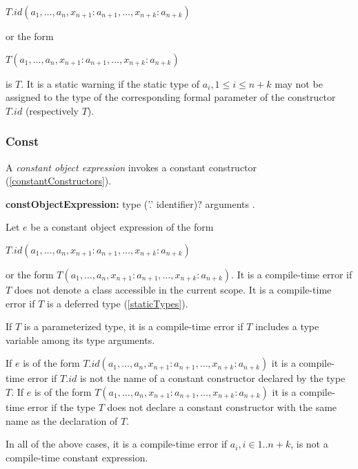 \documentclass{article}
\begin{document}
\NEW{} $T.id(a_1, \ldots , a_n, x_{n+1}: a_{n+1}, \ldots , x_{n+k}: a_{n+k})$ 

or the form 

\NEW{} $T(a_1, \ldots , a_n, x_{n+1}: a_{n+1}, \ldots , x_{n+k}: a_{n+k})$ 

is $T$.  
It is a static warning if the static type of $a_i, 1 \le i \le n+ k$ may not be assigned to the type of the corresponding formal parameter of the constructor $T.id$ (respectively $T$).



\subsubsection{ Const}

\LMHash{}
A {\em constant object expression} invokes a constant constructor (\ref{constantConstructors}). 

\begin{grammar}
{\bf constObjectExpression:}
\CONST{} type ('{\escapegrammar .}' identifier)? arguments
.
\end{grammar}

\LMHash{}
Let $e$ be a constant object expression of the form  

\CONST{} $T.id(a_1, \ldots , a_n, x_{n+1}: a_{n+1}, \ldots , x_{n+k}: a_{n+k})$ 

or the form  \CONST{} $T(a_1, \ldots , a_n, x_{n+1}: a_{n+1}, \ldots , x_{n+k}: a_{n+k})$. It is a compile-time error if $T$ does not denote a class accessible in the current scope.  It is a compile-time error if $T$ is a deferred type (\ref{staticTypes}).


\LMHash{}
If $T$ is a parameterized type, it is a compile-time error if $T$ includes a type variable among its type arguments.

\LMHash{}
If $e$ is of the form \CONST{} $T.id(a_1, \ldots , a_n, x_{n+1}: a_{n+1}, \ldots , x_{n+k}: a_{n+k})$ it is a compile-time error if $T.id$ is not the name of a constant constructor declared by the type $T$. If $e$ is of the form  \CONST{} $T(a_1, \ldots , a_n, x_{n+1}: a_{n+1}, \ldots , x_{n+k}: a_{n+k})$ it is a compile-time error if the type $T$ does not declare a constant constructor with the same name as the declaration of $T$. 

\LMHash{}
In all of the above cases, it is a compile-time error if $a_i,  i\in 1 .. n + k$, is not a compile-time constant expression.
\end{document}
